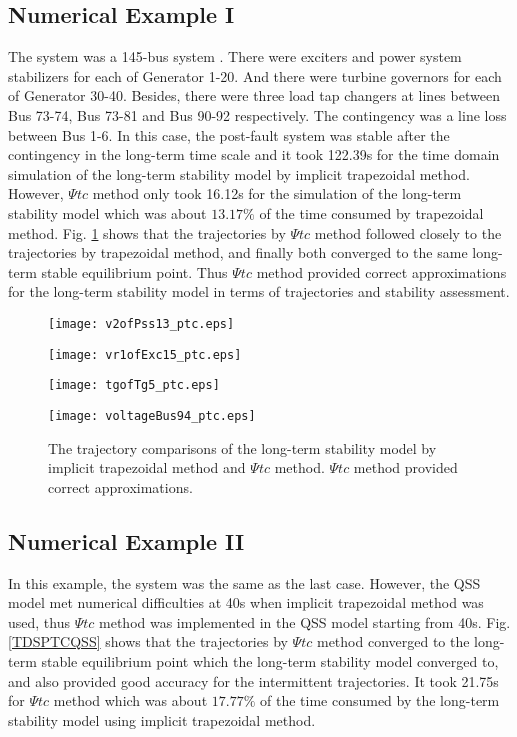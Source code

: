 \documentclass[journal]{IEEEtran}
\begin{document}
\subsection{Numerical Example I}\label{qss_numerical}
The system was a 145-bus system \cite{Vittal:article}. There were exciters and power system stabilizers for each of Generator 1-20. And there were turbine governors for each of Generator 30-40. Besides, there were three load tap changers at lines between Bus 73-74, Bus 73-81 and Bus 90-92 respectively. The contingency was a line loss between Bus 1-6.
In this case, the post-fault system was stable after the contingency in the long-term time scale and it took 122.39s for the time domain simulation of the long-term stability model by implicit trapezoidal method. However, $\Psi tc$ method only took 16.12s for the simulation of the long-term stability model which was about $13.17\%$ of the time consumed by trapezoidal method. Fig. \ref{TDSPTC} shows that the trajectories by $\Psi tc$ method followed closely to the trajectories by trapezoidal method, and finally both converged to the same long-term stable equilibrium point. Thus $\Psi tc$ method provided correct approximations for the long-term stability model in terms of trajectories and stability assessment.


\begin{figure}[!ht]
\centering
\begin{minipage}[t]{0.5\linewidth}
\texttt{[image: v2ofPss13\_ptc.eps]}
\end{minipage}\begin{minipage}[t]{0.5\linewidth}
\texttt{[image: vr1ofExc15\_ptc.eps]}
\end{minipage}
\begin{minipage}[t]{0.5\linewidth}
\texttt{[image: tgofTg5\_ptc.eps]}
\end{minipage}\begin{minipage}[t]{0.5\linewidth}
\texttt{[image: voltageBus94\_ptc.eps]}
\end{minipage}
\caption{The trajectory comparisons of the long-term stability model by implicit trapezoidal method and $\Psi tc$ method. $\Psi tc$ method provided correct approximations.}\label{TDSPTC}
\end{figure}

\subsection{Numerical Example II}
In this example, the system was the same as the last case. However, the QSS model met numerical difficulties at 40s when implicit trapezoidal method was used, thus $\Psi tc$ method was implemented in the QSS model starting from 40s. Fig. \ref{TDSPTCQSS} shows that the trajectories by $\Psi tc$ method converged to the long-term stable equilibrium point which the long-term stability model converged to, and also provided good accuracy for the intermittent trajectories. It took 21.75s for $\Psi tc$ method which  was about $17.77\%$ of the time consumed by the long-term stability model using implicit trapezoidal method.
\end{document}
